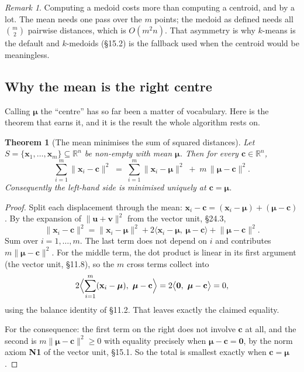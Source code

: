 \documentclass[11pt]{article}
\theoremstyle{plain}
\newtheorem{thm}{Theorem}[section]
\theoremstyle{definition}
\theoremstyle{remark}
\newtheorem*{rmk}{Remark}
\newcommand{\R}{\mathbb{R}}
\newcommand{\vc}[1]{\mathbf{#1}}
\newcommand{\norm}[1]{\lVert #1\rVert}
\newcommand{\bmu}{\boldsymbol{\mu}}
\begin{document}
\begin{rmk}
Computing a medoid costs more than computing a centroid, and by a lot. The mean
needs one pass over the $m$ points; the medoid as defined needs all
$\binom{m}{2}$ pairwise distances, which is $O(m^{2}n)$. That asymmetry is why
$k$-means is the default and $k$-medoids (\S15.2) is the fallback used when the
centroid would be meaningless.
\end{rmk}

\subsection{Why the mean is the right centre}
Calling $\bmu$ the ``centre'' has so far been a matter of vocabulary. Here is
the theorem that earns it, and it is the result the whole algorithm rests on.

\begin{thm}[The mean minimises the sum of squared distances]
Let $S=\{\vc{x}_1,\dots,\vc{x}_m\}\subseteq\R^{n}$ be non-empty with mean
$\bmu$. Then for every $\vc{c}\in\R^{n}$,
\[
  \sum_{i=1}^{m}\norm{\vc{x}_i-\vc{c}}^{2}
  \;=\;
  \sum_{i=1}^{m}\norm{\vc{x}_i-\bmu}^{2}
  \;+\; m\,\norm{\bmu-\vc{c}}^{2} .
\]
Consequently the left-hand side is minimised uniquely at $\vc{c}=\bmu$.
\end{thm}

\begin{proof}
Split each displacement through the mean:
$\vc{x}_i-\vc{c} = (\vc{x}_i-\bmu) + (\bmu-\vc{c})$. By the expansion of
$\norm{\vc{u}+\vc{v}}^{2}$ from the vector unit, \S24.3,
\[
  \norm{\vc{x}_i-\vc{c}}^{2}
  = \norm{\vc{x}_i-\bmu}^{2}
  + 2\bigl\langle \vc{x}_i-\bmu,\ \bmu-\vc{c}\bigr\rangle
  + \norm{\bmu-\vc{c}}^{2} .
\]
Sum over $i=1,\dots,m$. The last term does not depend on $i$ and contributes
$m\norm{\bmu-\vc{c}}^{2}$. For the middle term, the dot product is linear in
its first argument (the vector unit, \S11.8), so the $m$ cross terms collect
into
\[
  2\Bigl\langle \sum_{i=1}^{m}(\vc{x}_i-\bmu),\ \bmu-\vc{c}\Bigr\rangle
  = 2\bigl\langle \vc{0},\ \bmu-\vc{c}\bigr\rangle
  = 0 ,
\]
using the balance identity of \S11.2. That leaves exactly the claimed equality.

For the consequence: the first term on the right does not involve $\vc{c}$ at
all, and the second is $m\norm{\bmu-\vc{c}}^{2}\ge0$ with equality precisely
when $\bmu-\vc{c}=\vc{0}$, by the norm axiom \textbf{N1} of the vector unit,
\S15.1. So the total is smallest exactly when $\vc{c}=\bmu$.
\end{proof}
\end{document}
